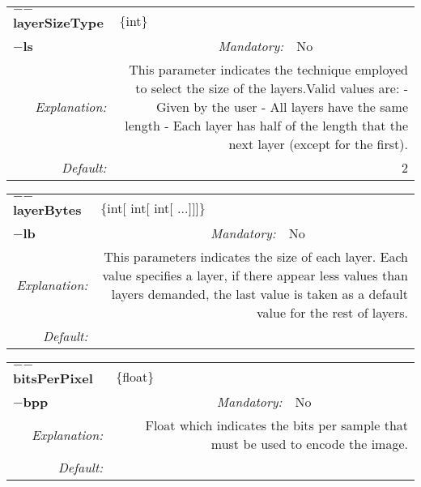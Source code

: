 \begin{center}\begin{tabular}{|rr|rlrl|}
\hline
\multicolumn{2}{|l|}{\textbf{$-$$-$layerSizeType}} & \multicolumn{4}{|l|}{$\{$int$\}$} \\
\cline{3-6}
\multicolumn{2}{|l|}{\textbf{$-$ls}} & \emph{Mandatory:} & No & &  \\
\hline
\emph{Explanation:} & \multicolumn{5}{|p{12cm}|}{This parameter indicates the technique employed to select the size of the layers.Valid values are:\newline 0 - Given by the user  \newline 1 - All layers have the same length \newline 2 - Each layer has half of the length that the next layer (except for the first).} \\
\hline
\emph{Default:} & \multicolumn{5}{|p{12cm}|}{2 } \\
\hline
\end{tabular}\end{center}
\begin{center}\begin{tabular}{|rr|rlrl|}
\hline
\multicolumn{2}{|l|}{\textbf{$-$$-$layerBytes}} & \multicolumn{4}{|l|}{$\{$int$[$ int$[$ int$[$ ...$]$$]$$]$$\}$} \\
\cline{3-6}
\multicolumn{2}{|l|}{\textbf{$-$lb}} & \emph{Mandatory:} & No & &  \\
\hline
\emph{Explanation:} & \multicolumn{5}{|p{12cm}|}{This parameters indicates the size of each layer. Each value specifies a layer, if there appear less values than layers demanded, the last value is taken as a default value for the rest of layers.} \\
\hline
\emph{Default:} & \multicolumn{5}{|p{12cm}|}{ } \\
\hline
\end{tabular}\end{center}
\begin{center}\begin{tabular}{|rr|rlrl|}
\hline
\multicolumn{2}{|l|}{\textbf{$-$$-$bitsPerPixel}} & \multicolumn{4}{|l|}{$\{$float$\}$} \\
\cline{3-6}
\multicolumn{2}{|l|}{\textbf{$-$bpp}} & \emph{Mandatory:} & No & &  \\
\hline
\emph{Explanation:} & \multicolumn{5}{|p{12cm}|}{Float which indicates the bits per sample that must be used to encode the image.} \\
\hline
\emph{Default:} & \multicolumn{5}{|p{12cm}|}{ } \\
\hline
\end{tabular}\end{center}
